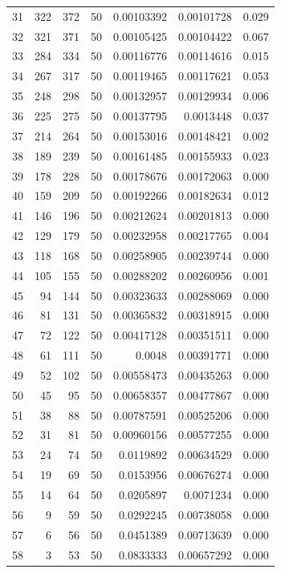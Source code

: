 \begin{tabular}{r r r r r r r}
31 & 322 & 372 & 50 & 0.00103392 & 0.00101728 & 0.029 \\
32 & 321 & 371 & 50 & 0.00105425 & 0.00104422 & 0.067 \\
33 & 284 & 334 & 50 & 0.00116776 & 0.00114616 & 0.015 \\
34 & 267 & 317 & 50 & 0.00119465 & 0.00117621 & 0.053 \\
35 & 248 & 298 & 50 & 0.00132957 & 0.00129934 & 0.006 \\
36 & 225 & 275 & 50 & 0.00137795 & 0.0013448 & 0.037 \\
37 & 214 & 264 & 50 & 0.00153016 & 0.00148421 & 0.002 \\
38 & 189 & 239 & 50 & 0.00161485 & 0.00155933 & 0.023 \\
39 & 178 & 228 & 50 & 0.00178676 & 0.00172063 & 0.000 \\
40 & 159 & 209 & 50 & 0.00192266 & 0.00182634 & 0.012 \\
41 & 146 & 196 & 50 & 0.00212624 & 0.00201813 & 0.000 \\
42 & 129 & 179 & 50 & 0.00232958 & 0.00217765 & 0.004 \\
43 & 118 & 168 & 50 & 0.00258905 & 0.00239744 & 0.000 \\
44 & 105 & 155 & 50 & 0.00288202 & 0.00260956 & 0.001 \\
45 & 94 & 144 & 50 & 0.00323633 & 0.00288069 & 0.000 \\
46 & 81 & 131 & 50 & 0.00365832 & 0.00318915 & 0.000 \\
47 & 72 & 122 & 50 & 0.00417128 & 0.00351511 & 0.000 \\
48 & 61 & 111 & 50 & 0.0048 & 0.00391771 & 0.000 \\
49 & 52 & 102 & 50 & 0.00558473 & 0.00435263 & 0.000 \\
50 & 45 & 95 & 50 & 0.00658357 & 0.00477867 & 0.000 \\
51 & 38 & 88 & 50 & 0.00787591 & 0.00525206 & 0.000 \\
52 & 31 & 81 & 50 & 0.00960156 & 0.00577255 & 0.000 \\
53 & 24 & 74 & 50 & 0.0119892 & 0.00634529 & 0.000 \\
54 & 19 & 69 & 50 & 0.0153956 & 0.00676274 & 0.000 \\
55 & 14 & 64 & 50 & 0.0205897 & 0.0071234 & 0.000 \\
56 & 9 & 59 & 50 & 0.0292245 & 0.00738058 & 0.000 \\
57 & 6 & 56 & 50 & 0.0451389 & 0.00713639 & 0.000 \\
58 & 3 & 53 & 50 & 0.0833333 & 0.00657292 & 0.000 \\

\end{tabular}
